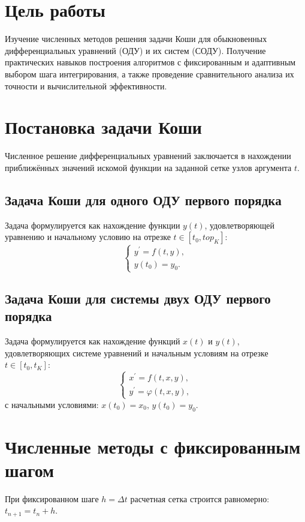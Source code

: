 \documentclass[a4paper]{article}
\begin{document}
\section{Цель работы}
Изучение численных методов решения задачи Коши для обыкновенных дифференциальных уравнений (ОДУ) и их систем (СОДУ). Получение практических навыков построения алгоритмов с фиксированным и адаптивным выбором шага интегрирования, а также проведение сравнительного анализа их точности и вычислительной эффективности.

\section{Постановка задачи Коши}
Численное решение дифференциальных уравнений заключается в нахождении приближённых значений искомой функции на заданной сетке узлов аргумента $t$.

\subsection{Задача Коши для одного ОДУ первого порядка}
Задача формулируется как нахождение функции $y(t)$, удовлетворяющей уравнению и начальному условию на отрезке $t \in [t_0, top_K]$:
\begin{equation}
\begin{cases}
y^{\prime} = f(t, y), \\
y(t_0) = y_0.
\end{cases}
\label{eq:ode}
\end{equation}

\subsection{Задача Коши для системы двух ОДУ первого порядка}
Задача формулируется как нахождение функций $x(t)$ и $y(t)$, удовлетворяющих системе уравнений и начальным условиям на отрезке $t \in [t_0, t_K]$:
\begin{equation}
\begin{cases}
x^{\prime} = f(t, x, y), \\
y^{\prime} = \varphi(t, x, y),
\end{cases}
\label{eq:system}
\end{equation}
с начальными условиями: $x(t_0) = x_0, \, y(t_0) = y_0$.

\section{Численные методы с фиксированным шагом}
При фиксированном шаге $h = \Delta t$ расчетная сетка строится равномерно: $t_{n+1} = t_n + h$.
\end{document}

